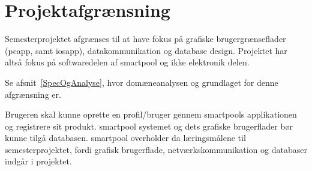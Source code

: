 \section{Projektafgrænsning}
Semesterprojektet afgrænses til at have fokus på grafiske brugergrænseflader (\gls{pcapp}, samt \gls{iosapp}), datakommunikation og database design. Projektet har altså fokus på softwaredelen af \gls{smartpool} og ikke elektronik delen.

Se afsnit~\ref{SpecOgAnalyse}, hvor domæneanalysen og grundlaget for denne afgrænsning er.

Brugeren skal kunne oprette en profil/bruger gennem \glspl{smartpool} applikationen og registrere sit produkt. \gls{smartpool} systemet og dets grafiske brugerflader bør kunne tilgå databasen. \gls{smartpool} overholder da læringsmålene til semesterprojektet, fordi grafisk brugerflade, netværkskommunikation og databaser indgår i projektet.

